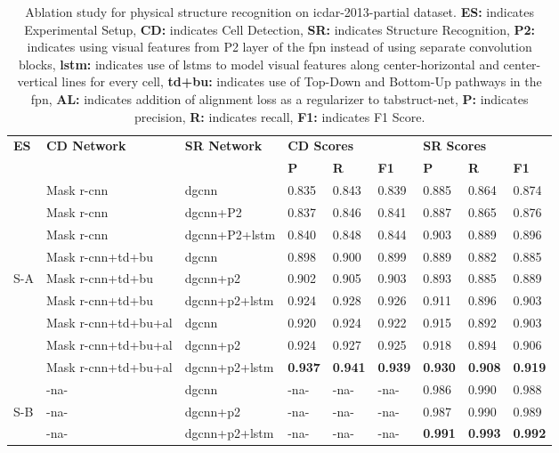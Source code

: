 \documentclass[runningheads]{llncs}
\begin{document}
\begin{table}
\addtolength{\tabcolsep}{-1.0pt}
\begin{center}
\begin{tabular}{|l|l |l |l l l| l l l|} \hline
\textbf{ES} &\textbf{CD Network} & \textbf{SR Network} &\multicolumn{3}{l|}{\textbf{CD Scores}} &\multicolumn{3}{l|}{\textbf{SR Scores}} \\ \cline{4-9}
 &  &   &\textbf{P} &\textbf{R} &\textbf{F1} &\textbf{P} &\textbf{R} &\textbf{F1} \\ \hline
&Mask {\sc r-cnn} &{\sc dgcnn} &0.835 &0.843 &0.839	&0.885 &0.864 &0.874 \\
&Mask {\sc r-cnn} &{\sc dgcnn}+P2 &0.837 &0.846	&0.841 &0.887 &0.865 &0.876 \\
&Mask {\sc r-cnn} &{\sc dgcnn}+P2+{\sc lstm} &0.840	&0.848	&0.844	&0.903	&0.889	&0.896 \\ \cline{2-9}
&Mask {\sc r-cnn}+{\sc td}+{\sc bu} &{\sc dgcnn} &0.898	&0.900	&0.899	&0.889	&0.882	&0.885 \\
S-A &Mask {\sc r-cnn}+{\sc td}+{\sc bu} &{\sc dgcnn}+{\sc p}2 &0.902 &0.905	&0.903 &0.893 &0.885 &0.889 \\ 
&Mask {\sc r-cnn}+{\sc td}+{\sc bu}	&{\sc dgcnn}+{\sc p}2+{\sc lstm} &0.924	&0.928	&0.926	&0.911	&0.896	&0.903 \\ \cline{2-9}
&Mask {\sc r-cnn}+{\sc td}+{\sc bu}+{\sc al} &{\sc dgcnn} &0.920 &0.924	&0.922 &0.915 &0.892 &0.903 \\	
&Mask {\sc r-cnn}+{\sc td}+{\sc bu}+{\sc al} &{\sc dgcnn}+{\sc p}2 &0.924 &0.927 &0.925	&0.918 &0.894 &0.906 \\
&Mask {\sc r-cnn}+{\sc td}+{\sc bu}+{\sc al} &{\sc dgcnn}+{\sc p}2+{\sc lstm} &\textbf{0.937} &\textbf{0.941}	&\textbf{0.939} &\textbf{0.930} &\textbf{0.908} &\textbf{0.919} \\ \hline
 & -{\sc na}- &{\sc dgcnn} & -{\sc na}- & -{\sc na}-  & -{\sc na}- &0.986 &0.990 &0.988 \\ 
S-B & -{\sc na}- &{\sc dgcnn}+{\sc p}2  & -{\sc na}- & -{\sc na}- & -{\sc na}- &0.987 &0.990 &0.989 \\
  & -{\sc na}-  &{\sc dgcnn}+{\sc p}2+{\sc lstm} & -{\sc na}- & -{\sc na}- & -{\sc na}- &\textbf{0.991} &\textbf{0.993} &\textbf{0.992} \\ \hline 
\end{tabular}
\end{center}
\caption{Ablation study for physical structure recognition on {\sc icdar}-2013-partial dataset. \textbf{ES:} indicates Experimental Setup, \textbf{CD:} indicates Cell Detection, \textbf{SR:} indicates Structure Recognition, \textbf{P2:} indicates using visual features from P2 layer of the {\sc fpn} instead of using separate convolution blocks, \textbf{{\sc lstm}:} indicates use of {\sc lstm}s to model visual features along center-horizontal and center-vertical lines for every cell, \textbf{{\sc td}+{\sc bu}:} indicates use of Top-Down and Bottom-Up pathways in the {\sc fpn}, \textbf{AL:} indicates addition of alignment loss as a regularizer to {\sc t}ab{\sc s}truct-{\sc n}et, \textbf{P:} indicates precision, \textbf{R:} indicates recall, \textbf{F1:} indicates F1 Score. \label{table_ablation_study_physical_icdar_2013_partial}}

\end{table}
\end{document}
